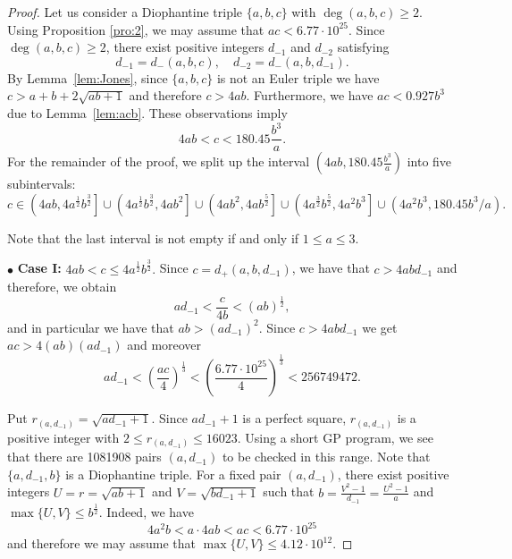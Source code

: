 \documentclass{amsart}
\theoremstyle{definition}
\begin{document}
\begin{proof}
Let us consider a Diophantine triple $\{a,b,c\}$ with $\deg(a,b,c)\ge 2$. Using Proposition \ref{pro:2}, we may assume that 
$ac<6.77 \cdot 10^{25}$. Since $\deg(a,b,c)\ge 2$, there exist positive integers $d_{-1}$ and $d_{-2}$ satisfying 
$$
d_{-1} = d_{-}(a,b,c),\quad d_{-2} = d_{-}(a,b,d_{-1}). 
$$ 
By Lemma~\ref{lem:Jones}, since $\{a,b,c\}$ is not an Euler triple we have $c>a+b+2\sqrt{ab+1}$ and therefore $c>4ab$.
Furthermore, we have $ac<0.927b^3$ due to Lemma~\ref{lem:acb}. These observations imply
$$
4ab<c<180.45\frac{b^3}{a}. 
$$ 
For the remainder of the proof, we split up the interval $\left(4ab,180.45\frac{b^3}{a}\right)$ into five subintervals:
$$
c\in \left(4ab, 4a^{\frac{1}{2}}b^{\frac{3}{2}}\right]\cup \left(4a^{\frac{1}{2}}b^{\frac{3}{2}},4ab^2\right]\cup \left(4ab^2,4ab^{\frac{5}{2}}\right]\cup \left(4a^{\frac{3}{2}}b^{\frac{5}{2}}, {4a^2b^3}\right] \cup \left({4a^2b^3}, {180.45b^3}/{a}\right). 
$$

Note that the last  interval is not empty if and only if $1\le a \le 3$. 

\vspace{5mm}


\noindent $\bullet$ \textbf{Case I:} $4ab<c\le 4a^{\frac{1}{2}}b^{\frac{3}{2}}.$  
Since $c=d_{+}(a,b,d_{-1})$, we have that $c>4abd_{-1}$ and therefore, we obtain
$$
ad_{-1}<\frac{c}{4b}<(ab)^{\frac{1}{2}},
$$
and in particular we have that $ab>(ad_{-1})^2$. Since $c>4abd_{-1}$ we get $ac>4(ab)(ad_{-1})$ and moreover 
$$
ad_{-1}<\left(\frac{ac}{4}\right)^{\frac{1}{3}}<\left(\frac{6.77\cdot 10^{25}}4\right)^{\frac{1}{3}}< 256749472.
$$
 
Put $r_{(a,d_{-1})} = \sqrt{ad_{-1}+1}$. Since $ad_{-1}+1$ is a perfect square, $r_{(a,d_{-1})}$ is a positive integer with $2\le r_{(a,d_{-1})}\le 16023$.
Using a short GP program, we see that there are 1081908 pairs $(a,d_{-1})$ to be checked in this range. Note that $\{a,d_{-1},b\}$ is
a Diophantine triple. For a fixed pair $(a,d_{-1})$, there exist positive integers $U=r= \sqrt{ab+1}$ and $V=\sqrt{bd_{-1}+1}$ such
that $b=\frac{V^2-1}{d_{-1}}=\frac{U^2-1}{a}$ and $\max\{U,V\}\le b^{\frac{1}{2}}$. Indeed, we have 
$$4a^2b<a \cdot 4ab<ac<6.77\cdot 10^{25}$$
and therefore we may assume that $\max\{U,V\}\le 4.12\cdot 10^{12}$.
  

\end{proof}
\end{document}
